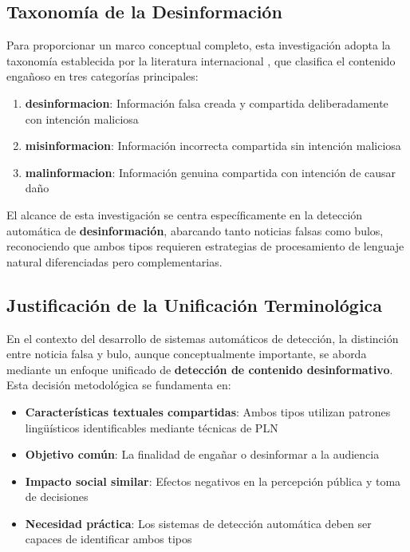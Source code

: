 \subsection{Taxonomía de la Desinformación}

Para proporcionar un marco conceptual completo, esta investigación adopta la taxonomía establecida por la literatura internacional \cite{bondielli2019survey, hu2022deep}, que clasifica el contenido engañoso en tres categorías principales:

\begin{enumerate}
    \item \textbf{\gls{desinformacion}}: Información falsa creada y compartida deliberadamente con intención maliciosa
    \item \textbf{\gls{misinformacion}}: Información incorrecta compartida sin intención maliciosa
    \item \textbf{\gls{malinformacion}}: Información genuina compartida con intención de causar daño
\end{enumerate}

El alcance de esta investigación se centra específicamente en la detección automática de \textbf{desinformación}, abarcando tanto noticias falsas como bulos, reconociendo que ambos tipos requieren estrategias de procesamiento de lenguaje natural diferenciadas pero complementarias.

\subsection{Justificación de la Unificación Terminológica}

En el contexto del desarrollo de sistemas automáticos de detección, la distinción entre noticia falsa y bulo, aunque conceptualmente importante, se aborda mediante un enfoque unificado de \textbf{detección de contenido desinformativo}. Esta decisión metodológica se fundamenta en:

\begin{itemize}
    \item \textbf{Características textuales compartidas}: Ambos tipos utilizan patrones lingüísticos identificables mediante técnicas de PLN
    \item \textbf{Objetivo común}: La finalidad de engañar o desinformar a la audiencia
    \item \textbf{Impacto social similar}: Efectos negativos en la percepción pública y toma de decisiones
    \item \textbf{Necesidad práctica}: Los sistemas de detección automática deben ser capaces de identificar ambos tipos
\end{itemize}

